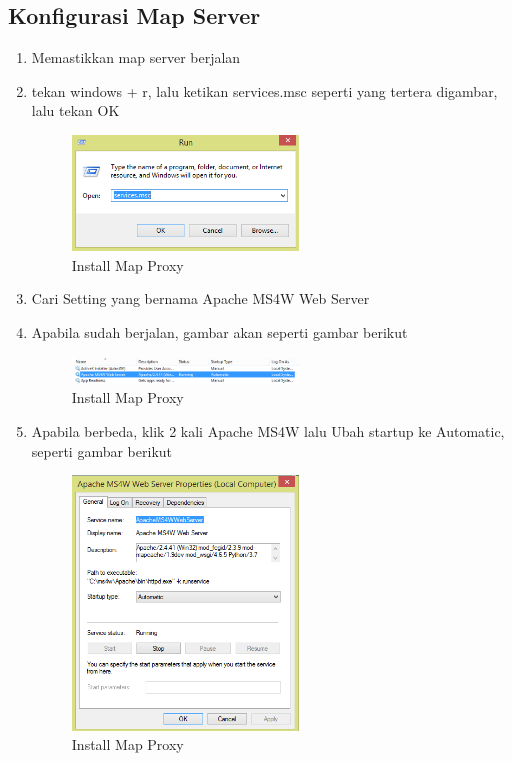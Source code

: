 \subsection{Konfigurasi Map Server}
\begin{enumerate}
	\item Memastikkan map server berjalan
	\item tekan windows + r, lalu ketikan services.msc seperti yang tertera digambar, lalu tekan OK
		\begin{figure}[H]
			\includegraphics[width=6cm]{figures/Tugas4/1174076/10.png}
			\centering
			\caption{Install Map Proxy}
		\end{figure}
	\item Cari Setting yang bernama Apache MS4W Web Server
	\item Apabila sudah berjalan, gambar akan seperti gambar berikut
		\begin{figure}[H]
			\includegraphics[width=6cm]{figures/Tugas4/1174076/11.png}
			\centering
			\caption{Install Map Proxy}
		\end{figure}
	\item Apabila berbeda, klik 2 kali Apache MS4W lalu Ubah startup ke Automatic, seperti gambar berikut
		\begin{figure}[H]
			\includegraphics[width=6cm]{figures/Tugas4/1174076/12.png}
			\centering
			\caption{Install Map Proxy}
		\end{figure}
\end{enumerate}

